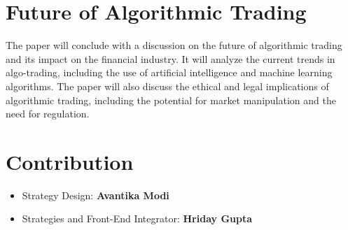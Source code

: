\section{Future of Algorithmic Trading}
The paper will conclude with a discussion on the future of algorithmic trading and its impact on the financial industry. It will analyze the current trends in algo-trading, including the use of artificial intelligence and machine learning algorithms. The paper will also discuss the ethical and legal implications of algorithmic trading, including the potential for market manipulation and the need for regulation.

\section{Contribution}
\begin{itemize}
    \item Strategy Design: \textbf{Avantika Modi}
    \item Strategies and Front-End Integrator: \textbf{Hriday Gupta}
\end{itemize}